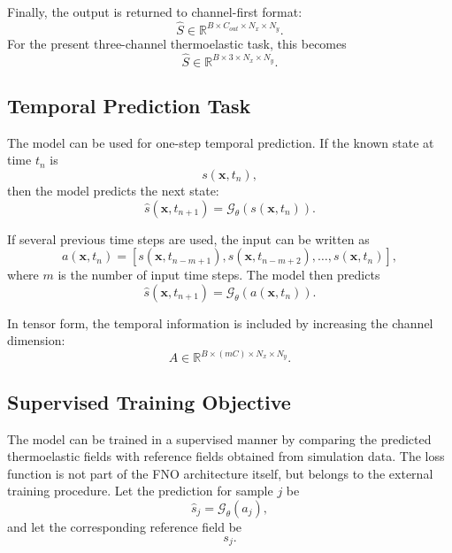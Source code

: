 Finally, the output is returned to channel-first format:
\begin{equation}
\hat{S}
\in
\mathbb{R}^{B \times C_{out} \times N_x \times N_y}.
\end{equation}
For the present three-channel thermoelastic task, this becomes
\begin{equation}
\hat{S}
\in
\mathbb{R}^{B \times 3 \times N_x \times N_y}.
\end{equation}

\subsection{Temporal Prediction Task}

The model can be used for one-step temporal prediction. If the known state at time \(t_n\) is
\begin{equation}
s(\boldsymbol{x}, t_n),
\end{equation}
then the model predicts the next state:
\begin{equation}
\hat{s}(\boldsymbol{x}, t_{n+1})
=
\mathcal{G}_{\theta}
\left(
s(\boldsymbol{x}, t_n)
\right).
\end{equation}

If several previous time steps are used, the input can be written as
\begin{equation}
a(\boldsymbol{x}, t_n)
=
\left[
s(\boldsymbol{x}, t_{n-m+1}),
s(\boldsymbol{x}, t_{n-m+2}),
\ldots,
s(\boldsymbol{x}, t_n)
\right],
\end{equation}
where \(m\) is the number of input time steps. The model then predicts
\begin{equation}
\hat{s}(\boldsymbol{x}, t_{n+1})
=
\mathcal{G}_{\theta}
\left(
a(\boldsymbol{x}, t_n)
\right).
\end{equation}

In tensor form, the temporal information is included by increasing the channel dimension:
\begin{equation}
A
\in
\mathbb{R}^{B \times (mC) \times N_x \times N_y}.
\end{equation}

\subsection{Supervised Training Objective}

The model can be trained in a supervised manner by comparing the predicted thermoelastic fields with reference fields obtained from simulation data. The loss function is not part of the FNO architecture itself, but belongs to the external training procedure. Let the prediction for sample \(j\) be
\begin{equation}
\hat{s}_j
=
\mathcal{G}_{\theta}(a_j),
\end{equation}
and let the corresponding reference field be
\begin{equation}
s_j.
\end{equation}

